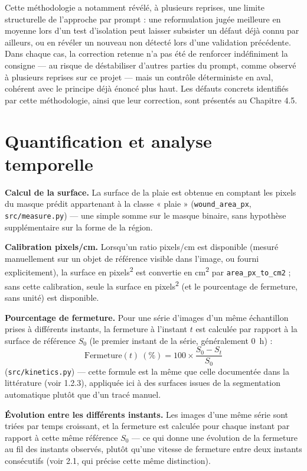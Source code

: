 \documentclass[12pt,a4paper]{report}
\begin{document}
Cette méthodologie a notamment révélé, à plusieurs reprises, une limite structurelle de l'approche par prompt : une reformulation jugée meilleure en moyenne lors d'un test d'isolation peut laisser subsister un défaut déjà connu par ailleurs, ou en révéler un nouveau non détecté lors d'une validation précédente. Dans chaque cas, la correction retenue n'a pas été de renforcer indéfiniment la consigne --- au risque de déstabiliser d'autres parties du prompt, comme observé à plusieurs reprises sur ce projet --- mais un contrôle déterministe en aval, cohérent avec le principe déjà énoncé plus haut. Les défauts concrets identifiés par cette méthodologie, ainsi que leur correction, sont présentés au Chapitre 4.5.

\section{Quantification et analyse temporelle}

\textbf{Calcul de la surface.} La surface de la plaie est obtenue en comptant les pixels du masque prédit appartenant à la classe « plaie » (\texttt{wound\_area\_px}, \texttt{src/measure.py}) --- une simple somme sur le masque binaire, sans hypothèse supplémentaire sur la forme de la région.

\textbf{Calibration pixels/cm.} Lorsqu'un ratio pixels/cm est disponible (mesuré manuellement sur un objet de référence visible dans l'image, ou fourni explicitement), la surface en pixels\textsuperscript{2} est convertie en cm\textsuperscript{2} par \texttt{area\_px\_to\_cm2} ; sans cette calibration, seule la surface en pixels\textsuperscript{2} (et le pourcentage de fermeture, sans unité) est disponible.

\textbf{Pourcentage de fermeture.} Pour une série d'images d'un même échantillon prises à différents instants, la fermeture à l'instant $t$ est calculée par rapport à la surface de référence $S_0$ (le premier instant de la série, généralement 0~h) :
$$\text{Fermeture}(t)\ (\%) = 100 \times \frac{S_0 - S_t}{S_0}$$
(\texttt{src/kinetics.py}) --- cette formule est la même que celle documentée dans la littérature (voir 1.2.3), appliquée ici à des surfaces issues de la segmentation automatique plutôt que d'un tracé manuel.

\textbf{Évolution entre les différents instants.} Les images d'une même série sont triées par temps croissant, et la fermeture est calculée pour chaque instant par rapport à cette même référence $S_0$ --- ce qui donne une évolution de la fermeture au fil des instants observés, plutôt qu'une vitesse de fermeture entre deux instants consécutifs (voir 2.1, qui précise cette même distinction).
\end{document}
